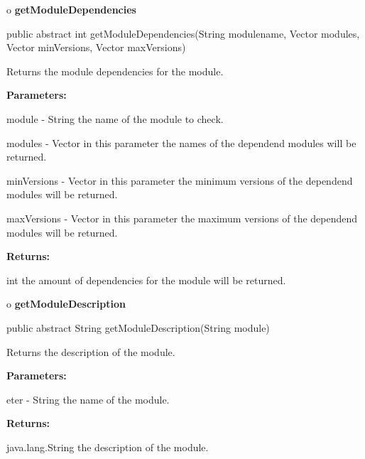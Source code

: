 o {\bf getModuleDependencies} 

\begin{PRE}
 public abstract int getModuleDependencies(String modulename,
                                           Vector modules,
                                           Vector minVersions,
                                           Vector maxVersions)
\end{PRE}

\begin{description}
\htmlDD Returns the module dependencies for the module. 

\begin{description}
\item {\bf Parameters:}  

module - String the name of the module to check.  

modules - Vector in this parameter the names of the dependend modules will be
returned.  

minVersions - Vector in this parameter the minimum versions of the dependend
modules will be returned.  

maxVersions - Vector in this parameter the maximum versions of the dependend
modules will be returned.  
\item {\bf Returns:}  

int the amount of dependencies for the module will be returned.  
\end{description}

\end{description}

o {\bf getModuleDescription} 

\begin{PRE}
 public abstract String getModuleDescription(String module)
\end{PRE}

\begin{description}
\htmlDD Returns the description of the module. 

\begin{description}
\item {\bf Parameters:}  

eter - String the name of the module.  
\item {\bf Returns:}  

java.lang.String the description of the module.  
\end{description}

\end{description}


